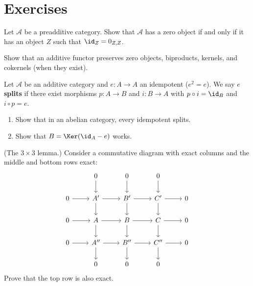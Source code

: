 \section{Exercises}\label{sec:abelian-exercises}

\begin{exercise}\label{exo:preadditive-zero}
Let $\mathcal{A}$ be a preadditive category. Show that $\mathcal{A}$ has a zero object if and
only if it has an object $Z$ such that $\id_Z = 0_{Z,Z}$.
\end{exercise}

\begin{exercise}\label{exo:additive-functor-zero}
Show that an additive functor preserves zero objects, biproducts, kernels, and cokernels
(when they exist).
\end{exercise}

\begin{exercise}\label{exo:idempotent-split}
Let $\mathcal{A}$ be an additive category and $e \colon A \to A$ an idempotent ($e^2 = e$).
We say $e$ \textbf{splits} if there exist morphisms $p \colon A \to B$ and $i \colon B \to A$
with $p \circ i = \id_B$ and $i \circ p = e$.
\begin{enumerate}
    \item Show that in an abelian category, every idempotent splits.
    \item Show that $B = \Ker(\id_A - e)$ works.
\end{enumerate}
\end{exercise}

\begin{exercise}\label{exo:nine-lemma}
(The $3 \times 3$ lemma.) Consider a commutative diagram with exact columns and
the middle and bottom rows exact:
\[
\begin{tikzcd}
    & 0 \arrow[d] & 0 \arrow[d] & 0 \arrow[d] & \\
    0 \arrow[r] & A' \arrow[r] \arrow[d] & B' \arrow[r] \arrow[d] & C' \arrow[r] \arrow[d] & 0 \\
    0 \arrow[r] & A \arrow[r] \arrow[d] & B \arrow[r] \arrow[d] & C \arrow[r] \arrow[d] & 0 \\
    0 \arrow[r] & A'' \arrow[r] \arrow[d] & B'' \arrow[r] \arrow[d] & C'' \arrow[r] \arrow[d] & 0 \\
    & 0 & 0 & 0 &
\end{tikzcd}
\]
Prove that the top row is also exact.
\end{exercise}

